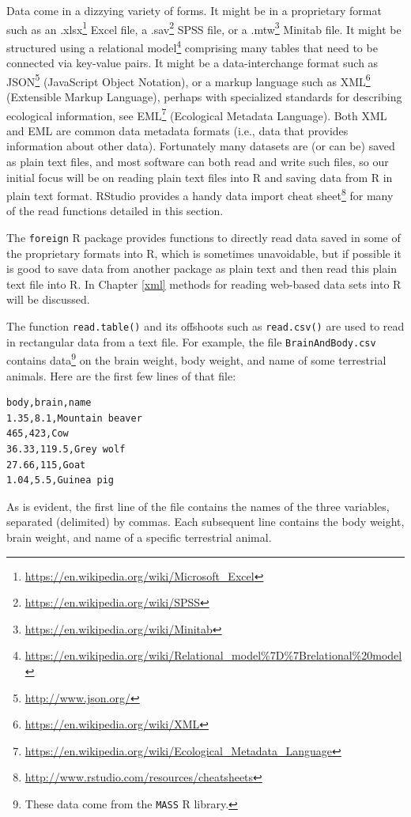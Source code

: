 \documentclass[
]{krantz}
\renewcommand{\href}[2]{#2\footnote{\url{#1}}}
\begin{document}
Data come in a dizzying variety of forms. It might be in a proprietary format such as an \href{https://en.wikipedia.org/wiki/Microsoft_Excel}{.xlsx} Excel file, a \href{https://en.wikipedia.org/wiki/SPSS}{.sav} SPSS file, or a \href{https://en.wikipedia.org/wiki/Minitab}{.mtw} Minitab file. It might be structured using a \href{https://en.wikipedia.org/wiki/Relational_model\%7D\%7Brelational\%20model}{relational model} comprising many tables that need to be connected via key-value pairs. It might be a data-interchange format such as \href{http://www.json.org/}{JSON} (JavaScript Object Notation), or a markup language such as \href{https://en.wikipedia.org/wiki/XML}{XML} (Extensible Markup Language), perhaps with specialized standards for describing ecological information, see \href{https://en.wikipedia.org/wiki/Ecological_Metadata_Language}{EML} (Ecological Metadata Language). Both XML and EML are common data metadata formats (i.e., data that provides information about other data). Fortunately many datasets are (or can be) saved as plain text files, and most software can both read and write such files, so our initial focus will be on reading plain text files into R and saving data from R in plain text format. RStudio provides a handy \href{http://www.rstudio.com/resources/cheatsheets}{data import cheat sheet} for many of the read functions detailed in this section.

The \texttt{foreign} R package provides functions to directly read data saved in some of the proprietary formats into R, which is sometimes unavoidable, but if possible it is good to save data from another package as plain text and then read this plain text file into R. In Chapter \ref{xml} methods for reading web-based data sets into R will be discussed.

The function \texttt{read.table()} and its offshoots such as \texttt{read.csv()} are used to read in rectangular data from a text file. For example, the file \texttt{BrainAndBody.csv} contains data\footnote{These data come from the \texttt{MASS} R library.} on the brain weight, body weight, and name of some terrestrial animals. Here are the first few lines of that file:

\begin{verbatim}
body,brain,name
1.35,8.1,Mountain beaver
465,423,Cow
36.33,119.5,Grey wolf
27.66,115,Goat
1.04,5.5,Guinea pig
\end{verbatim}

As is evident, the first line of the file contains the names of the three variables, separated (delimited) by commas. Each subsequent line contains the body weight, brain weight, and name of a specific terrestrial animal.
\end{document}

